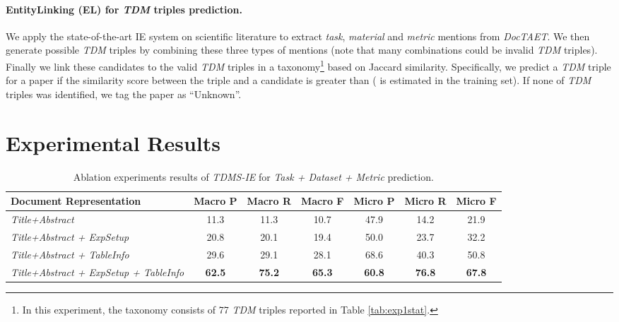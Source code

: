\documentclass[11pt,a4paper]{article}
\begin{document}
\paragraph{EntityLinking (EL) for \emph{TDM} triples prediction.} We apply the state-of-the-art IE system on scientific literature \cite{Luan2018} 
to extract \emph{task}, \emph{material} and \emph{metric} mentions from \emph{DocTAET}. We then generate possible \emph{TDM} triples by combining these three types of mentions (note that many combinations could be invalid \emph{TDM} triples). Finally we link these candidates to the valid \emph{TDM} triples in a taxonomy\footnote{In this experiment, the taxonomy consists of 77 \emph{TDM} triples reported in Table \ref{tab:exp1stat}.} based on Jaccard similarity.  Specifically, we predict a \emph{TDM} triple for a paper if the similarity score between the triple and a candidate is greater than  ( is estimated in the training set). If none of \emph{TDM} triples was identified, we tag the paper as ``Unknown''.











\section{Experimental Results}\label{sec:results}


\begin{table*}[t]
\begin{center}
\begin{small}
\begin{tabular}{lcccccc}
\hline
Document Representation&Macro P&Macro R&Macro F&Micro P&Micro R&Micro F\\ \hline
\emph{Title+Abstract}&11.3&11.3&10.7&47.9&14.2&21.9 \\
\emph{Title+Abstract + ExpSetup}&20.8&20.1&19.4&50.0&23.7&32.2 \\
\emph{Title+Abstract + TableInfo}&29.6&29.1&28.1&68.6&40.3&50.8 \\
\emph{Title+Abstract + ExpSetup + TableInfo}&\textbf{62.5}&\textbf{75.2}&\textbf{65.3}&\textbf{60.8}&\textbf{76.8}&\textbf{67.8} \\
 \hline
\end{tabular}
\end{small}
\end{center}
\caption{\label{tab:exp1ablation}  Ablation experiments results of  \emph{TDMS-IE} for \emph{Task + Dataset + Metric} prediction.}
\end{table*}
\end{document}

